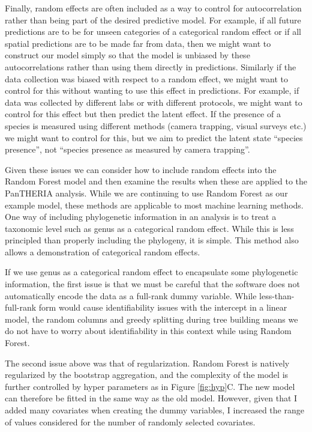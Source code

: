 \documentclass[12pt]{article}
\begin{document}
Finally, random effects are often included as a way to control for autocorrelation rather than being part of the desired predictive model.
For example, if all future predictions are to be for unseen categories of a categorical random effect or if all spatial predictions are to be made far from data, then we might want to construct our model simply so that the model is unbiased by these autocorrelations rather than using them directly in predictions.
Similarly if the data collection was biased with respect to a random effect, we might want to control for this without wanting to use this effect in predictions.
For example, if data was collected by different labs or with different protocols, we might want to control for this effect but then predict the latent effect.
If the presence of a species is measured using different methods (camera trapping, visual surveys etc.) we might want to control for this, but we aim to predict the latent state ``species presence'', not ``species presence as measured by camera trapping''.


Given these issues we can consider how to include random effects into the Random Forest model and then examine the results when these are applied to the PanTHERIA analysis.
While we are continuing to use Random Forest as our example model, these methods are applicable to most machine learning methods.
One way of including phylogenetic information in an analysis is to treat a taxonomic level such as genus as a categorical random effect.
While this is less principled than properly including the phylogeny, it is simple.
This method also allows a demonstration of categorical random effects.

If we use genus as a categorical random effect to encapsulate some phylogenetic information, the first issue is that we must be careful that the software does not automatically encode the data as a full-rank dummy variable.
While less-than-full-rank form would cause identifiability issues with the intercept in a linear model, the random columns and greedy splitting during tree building means we do not have to worry about identifiability in this context while using Random Forest.

The second issue above was that of regularization.
Random Forest is natively regularized by the bootstrap aggregation, and the complexity of the model is further controlled by hyper parameters as in Figure \ref{fig:hyp}C.
The new model can therefore be fitted in the same way as the old model.
However, given that I added many covariates when creating the dummy variables, I increased the range of values considered for the number of randomly selected covariates.
\end{document}
